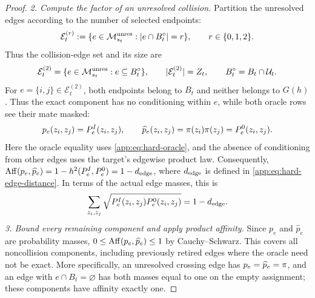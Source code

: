 \begin{proof}
\emph{2. Compute the factor of an unresolved collision.}
Partition the unresolved edges according to the number of selected endpoints:
\begin{equation}
 \mathcal E_t^{(r)}:=
 \{e\in\mathcal M_{s_t}^{\mathrm{unres}}:
       |e\cap B_{t}^{\circ}|=r\},
 \qquad r\in\{0,1,2\}.
 \label{app:eq:commit-edge-partition}
\end{equation}
Thus the collision-edge set and its size are
\[
 \mathcal E_t^{(2)}
 =\{e\in\mathcal M_{s_t}^{\mathrm{unres}}:
                       e\subseteq B_{t}^{\circ}\},
 \qquad
 |\mathcal E_t^{(2)}|=Z_{t},
 \qquad
 B_{t}^{\circ}=B_t\cap\mathcal U_{t}.
\]
For \(e=\{i,j\}\in\mathcal E_t^{(2)}\), both endpoints belong to \(B_t\)
and neither belongs to \(G(h)\). Thus the exact component has no
conditioning within \(e\), while both oracle rows see their mate masked:
\[
 p_e(z_i,z_j)=P_{e}^{I}(z_i,z_j),
 \qquad
 \widehat p_e(z_i,z_j)
 =\pi(z_i)\pi(z_j)
 =P_{e}^{0}(z_i,z_j).
\]
Here the oracle equality uses \eqref{app:eq:hard-oracle}, and the absence
of conditioning from other edges uses the target's edgewise product law.
Consequently,
\(\operatorname{Aff}(p_e,\widehat p_e)
 =1-h^2(P_{e}^{I},P_{e}^{0})
 =1-d_{\mathrm{edge}}\), where \(d_{\mathrm{edge}}\) is defined in
\eqref{app:eq:hard-edge-distance}. In terms of the actual edge masses,
this is
\begin{equation}
 \sum_{z_i,z_j}
 \sqrt{P_{e}^{I}(z_i,z_j)
       P_{e}^{0}(z_i,z_j)}
 =1-d_{\mathrm{edge}}.
 \label{app:eq:one-collision-affinity}
\end{equation}
\emph{3. Bound every remaining component and apply product affinity.}
Since \(p_e\) and \(\widehat p_e\) are probability masses,
\(0\le\operatorname{Aff}(p_e,\widehat p_e)\le1\) by Cauchy--Schwarz.
This covers all noncollision components, including previously retired
edges where the oracle need not be exact. More specifically, an unresolved
crossing edge has \(p_e=\widehat p_e=\pi\), and an edge with
\(e\cap B_t=\varnothing\) has both masses equal to one on the empty
assignment; these components have affinity exactly one.


\end{proof}
